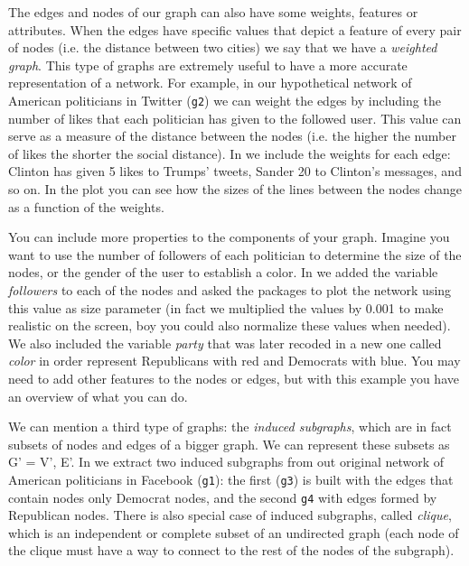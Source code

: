 
The edges and nodes of our graph can also have some weights, features or attributes. When the edges have specific values that depict a feature of every pair of nodes (i.e. the distance between two cities) we say that we have a \textit{weighted graph}. This type of graphs are extremely useful to have a more accurate representation of a network. For example, in our hypothetical network of American politicians in Twitter (\texttt{g2}) we can weight the edges by including the number of likes that each politician has given to the followed user. This value  can serve as a measure of the distance between the nodes (i.e. the higher the number of likes the shorter the social distance). In  we include the weights for each edge: Clinton has given 5 likes to Trumps' tweets, Sander 20 to Clinton's messages, and so on. In the plot you can see how the sizes of the lines between the nodes change as a function of the weights.


You can include more properties to the components of your graph. Imagine you want to use the number of followers of each politician to determine the size of the nodes, or the gender of the user to establish a color. In  we added the variable \emph{followers} to each of the nodes and asked the packages to plot the network using this value as size parameter (in fact we multiplied the values by 0.001 to make realistic on the screen, boy you could also normalize these values when needed). We also included the variable \emph{party} that was later recoded in a new one called \emph{color} in order represent Republicans with red and Democrats with blue.  You may need to add other features to the nodes or edges, but with this example you have an overview of what you can do.


We can  mention a third type of graphs: the \textit{induced subgraphs}, which are in fact subsets of nodes and edges of a bigger graph. We can represent these subsets as G' = V', E'. In  we extract two induced subgraphs from out original network of American politicians in Facebook (\texttt{g1}): the first (\texttt{g3}) is built with the edges that contain nodes only Democrat nodes, and the second \texttt{g4} with edges formed by Republican nodes. There is also special case of induced subgraphs, called \textit{clique}, which is an independent or complete subset of an undirected graph (each node of the clique must have a way to connect to the rest of the nodes of the subgraph).

